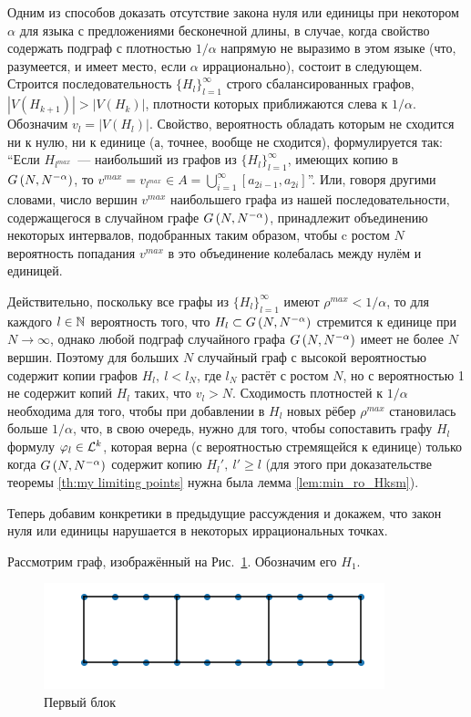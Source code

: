 Одним из способов доказать отсутствие закона нуля  или единицы при некотором $\alpha$ для языка с предложениями бесконечной длины, в случае, когда свойство содержать подграф с плотностью $1/\alpha$ напрямую не выразимо в этом языке (что, разумеется, и имеет место, если $\alpha$ иррационально), состоит в следующем.
\def \seql {\{H_l\}_{l=1}^\infty}
Строится последовательность $\seql$ строго сбалансированных графов, $|V(H_{k+1})| > |V(H_{k})|$, плотности которых приближаются слева к $1/\alpha$.
Обозначим $v_l = |V(H_l)|$.
Свойство, вероятность обладать которым не сходится ни к нулю, ни к единице (а, точнее, вообще не сходится), формулируется так: ``Если $H_{l^{max}}$~--- наибольший из графов из $\seql$, имеющих копию в $G\left(N,N^{-\alpha}\right)$, то $v^{max} = v_{l^{max}} \in A = \bigcup_{i=1}^\infty [a_{2i-1},a_{2i}]$''. Или, говоря другими словами, число  вершин $v^{max}$ наибольшего графа из нашей последовательности, содержащегося в случайном графе $G\left(N,N^{-\alpha}\right)$, принадлежит объединению некоторых интервалов, подобранных таким образом, чтобы c ростом $N$ вероятность попадания $v^{max}$ в это объединение колебалась между нулём и единицей.

Действительно, поскольку все графы из $\seql$ имеют $\rho^{max} < 1/\alpha$, то для каждого $l \in \mathbb {N}$ вероятность того, что $H_l \subset G\left(N,N^{-\alpha}\right)$ стремится  к единице при $N \rightarrow \infty$, однако любой подграф случайного графа $G\left(N,N^{-\alpha}\right)$ имеет не более $N$ вершин.
Поэтому для больших $N$ случайный граф с высокой вероятностью содержит копии графов $H_l,~ l < l_N$, где $l_N$ растёт с ростом $N$, но с вероятностью 1 не содержит копий $H_l$ таких, что $v_l > N$.
Сходимость плотностей к $1/\alpha$ необходима для того, чтобы при добавлении в $H_l$ новых рёбер $\rho^{max}$ становилась больше $1/\alpha$, что, в свою очередь, нужно для того, чтобы сопоставить графу $H_l$ формулу $\varphi_l \in \mathcal{L}^k$, которая верна (с вероятностью стремящейся к единице) только когда $G\left(N,N^{-\alpha}\right)$ содержит копию $H_l',~ l' \geq l$ (для этого при доказательстве теоремы \ref{th:my limiting points} нужна была лемма \ref{lem:min_ro_Hksm}).

Теперь добавим конкретики в предыдущие рассуждения и докажем, что закон нуля или единицы нарушается в некоторых иррациональных точках.

Рассмотрим граф, изображённый на Рис.~\ref{fig:first block}. Обозначим его $H_1$.
\begin{figure}
  \centering
  \includegraphics[scale=0.5]{picrel/first_block.png}
  \caption{Первый блок}
  \label{fig:first block}
\end{figure}

